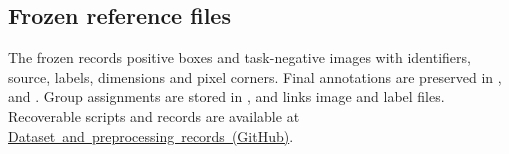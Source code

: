 \subsection{Frozen reference files}

The frozen  records positive boxes and task-negative images with identifiers, source, labels, dimensions and pixel corners. Final annotations are preserved in ,  and . Group assignments are stored in , and  links image and label files. Recoverable scripts and records are available at \mbox{\href{https://github.com/HopperHou/X-ray-thesis/tree/main/dataset}{Dataset and preprocessing records (GitHub)}}.
